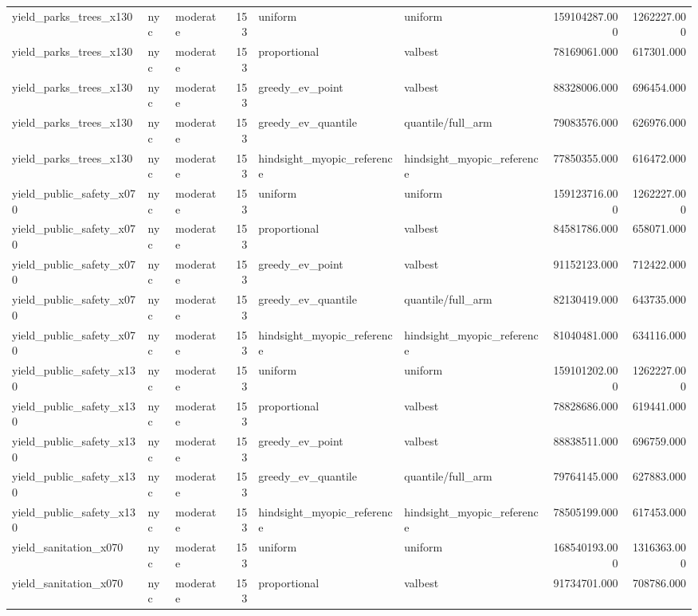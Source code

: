 \begin{tabular}{lllrllrr}
yield\_parks\_trees\_x130 & nyc & moderate & 153 & uniform & uniform & 159104287.000 & 1262227.000 \\
yield\_parks\_trees\_x130 & nyc & moderate & 153 & proportional & valbest & 78169061.000 & 617301.000 \\
yield\_parks\_trees\_x130 & nyc & moderate & 153 & greedy\_ev\_point & valbest & 88328006.000 & 696454.000 \\
yield\_parks\_trees\_x130 & nyc & moderate & 153 & greedy\_ev\_quantile & quantile/full\_arm & 79083576.000 & 626976.000 \\
yield\_parks\_trees\_x130 & nyc & moderate & 153 & hindsight\_myopic\_reference & hindsight\_myopic\_reference & 77850355.000 & 616472.000 \\
yield\_public\_safety\_x070 & nyc & moderate & 153 & uniform & uniform & 159123716.000 & 1262227.000 \\
yield\_public\_safety\_x070 & nyc & moderate & 153 & proportional & valbest & 84581786.000 & 658071.000 \\
yield\_public\_safety\_x070 & nyc & moderate & 153 & greedy\_ev\_point & valbest & 91152123.000 & 712422.000 \\
yield\_public\_safety\_x070 & nyc & moderate & 153 & greedy\_ev\_quantile & quantile/full\_arm & 82130419.000 & 643735.000 \\
yield\_public\_safety\_x070 & nyc & moderate & 153 & hindsight\_myopic\_reference & hindsight\_myopic\_reference & 81040481.000 & 634116.000 \\
yield\_public\_safety\_x130 & nyc & moderate & 153 & uniform & uniform & 159101202.000 & 1262227.000 \\
yield\_public\_safety\_x130 & nyc & moderate & 153 & proportional & valbest & 78828686.000 & 619441.000 \\
yield\_public\_safety\_x130 & nyc & moderate & 153 & greedy\_ev\_point & valbest & 88838511.000 & 696759.000 \\
yield\_public\_safety\_x130 & nyc & moderate & 153 & greedy\_ev\_quantile & quantile/full\_arm & 79764145.000 & 627883.000 \\
yield\_public\_safety\_x130 & nyc & moderate & 153 & hindsight\_myopic\_reference & hindsight\_myopic\_reference & 78505199.000 & 617453.000 \\
yield\_sanitation\_x070 & nyc & moderate & 153 & uniform & uniform & 168540193.000 & 1316363.000 \\
yield\_sanitation\_x070 & nyc & moderate & 153 & proportional & valbest & 91734701.000 & 708786.000 \\

\end{tabular}
